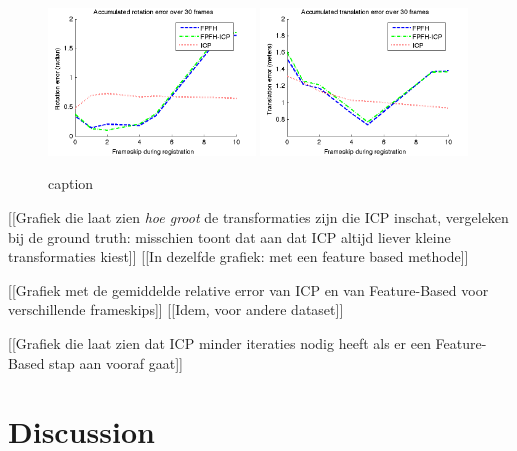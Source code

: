 \documentclass[a4paper]{article}
\begin{document}
\begin{figure}[H]
    \centering
        \includegraphics[width=0.49\textwidth]{ims/deskAccumulatedrotationerrorover30frames.png}
        \includegraphics[width=0.49\textwidth]{ims/deskAccumulatedtranslationerrorover30frames.png}
    \caption{caption}
    \label{fig:ims_desk - Accumulated rotation error over 30 frames}
\end{figure}



[[Grafiek die laat zien \emph{hoe groot} de transformaties zijn die ICP inschat, vergeleken bij de ground truth: misschien toont dat aan dat ICP altijd liever kleine transformaties kiest]]
[[In dezelfde grafiek: met een feature based methode]]

[[Grafiek met de gemiddelde relative error van ICP en van Feature-Based voor verschillende frameskips]]
[[Idem, voor andere dataset]]

[[Grafiek die laat zien dat ICP minder iteraties nodig heeft als er een Feature-Based stap aan vooraf gaat]]

\section{Discussion}





{}

\end{document}
